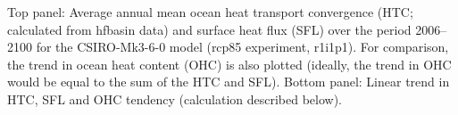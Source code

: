 \label{fig:csiro_full}
Top panel: Average annual mean ocean heat transport convergence (HTC; calculated from hfbasin data) and surface heat flux (SFL) over the period 2006--2100 for the CSIRO-Mk3-6-0 model (rcp85 experiment, r1i1p1). For comparison, the trend in ocean heat content (OHC) is also plotted (ideally, the trend in OHC would be equal to the sum of the HTC and SFL). Bottom panel: Linear trend in HTC, SFL and OHC tendency (calculation described below).